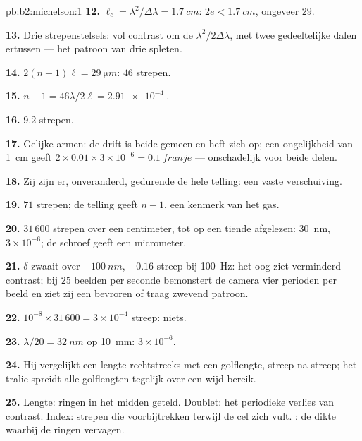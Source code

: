 \begin{solution}{pb:b2:michelson:1}
\textbf{12.} $\ell_c = \lambda^2/\Delta\lambda = \qty{1.7}{cm}$:
$2e < \qty{1.7}{cm}$, ongeveer $29$.

\textbf{13.} Drie strepenstelsels: vol contrast om de
$\lambda^2/2\Delta\lambda$, met
twee gedeeltelijke dalen ertussen --- het patroon van drie spleten.

\textbf{14.} $2(n - 1)\ell = \qty{29}{\micro m}$: $46$ strepen.

\textbf{15.} $n - 1 = 46\lambda/2\ell = \qty{2.91e-4}{}$.

\textbf{16.} $9.2$ strepen.

\textbf{17.} Gelijke armen: de drift is beide gemeen en heft zich op; een
ongelijkheid van \qty{1}{cm} geeft
$2 \times 0.01 \times 3 \times 10^{-6} = \qty{0.1}{franje}$ ---
onschadelijk voor beide delen.

\textbf{18.} Zij zijn er, onveranderd, gedurende de hele telling: een
vaste verschuiving.

\textbf{19.} $71$ strepen; de telling geeft $n - 1$, een kenmerk van het gas.

\textbf{20.} $31\,600$ strepen over een centimeter, tot op een tiende afgelezen:
\qty{30}{nm}, $3 \times 10^{-6}$; de schroef geeft een micrometer.

\textbf{21.} $\delta$ zwaait over $\pm\qty{100}{nm}$, $\pm0.16$ streep bij
\qty{100}{Hz}: het
oog ziet verminderd contrast; bij $25$ beelden per seconde bemonstert de camera
vier perioden per beeld en ziet zij een bevroren of traag zwevend
patroon.

\textbf{22.} $10^{-8} \times 31\,600 = 3 \times 10^{-4}$ streep: niets.

\textbf{23.} $\lambda/20 = \qty{32}{nm}$ op \qty{10}{mm}: $3 \times 10^{-6}$.

\textbf{24.} Hij vergelijkt een lengte rechtstreeks met een golflengte, streep na
streep; het tralie spreidt alle golflengten tegelijk over een wijd bereik.

\textbf{25.} Lengte: ringen in het midden geteld. Doublet: het
periodieke verlies van contrast. Index: strepen die voorbijtrekken terwijl de cel
zich vult. : de dikte waarbij de ringen vervagen.
\end{solution}
